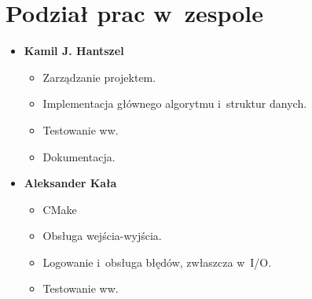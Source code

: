 \documentclass[12pt, a4paper]{article}
\begin{document}
\section{Podział prac w zespole}
\begin{itemize}
	\item \textbf {Kamil J. Hantszel}
		\begin{itemize}
			\item Zarządzanie projektem.
			\item Implementacja głównego algorytmu i struktur danych.
			\item Testowanie ww.
			\item Dokumentacja.            
		\end{itemize}
	\item \textbf {Aleksander Kała}
		\begin{itemize}
			\item CMake
			\item Obsługa wejścia-wyjścia.
			\item Logowanie i obsługa błędów, zwłaszcza w I/O.
			\item Testowanie ww.
		\end{itemize}
\end{itemize}
\end{document}
